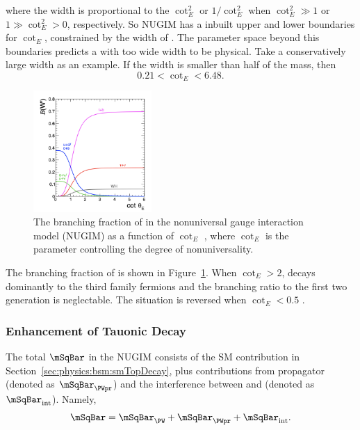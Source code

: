 \noindent where the width is proportional to the $ \cot^2_E $ or $ 1/\cot^2_E$ when $\cot^2_E \gg 1$ or $1 \gg \cot^2_E > 0$, respectively.  So NUGIM has a inbuilt upper and lower boundaries for $\cot_E$, constrained by the width of \PWpr. The parameter space beyond this boundaries predicts a \PWpr with too wide width to be physical.  Take a conservatively large width as an example. If the width is smaller than half of the \PWpr mass, then 
\begin{equation}
    0.21 < \cot_E < 6.48.
\end{equation}


\begin{figure}[ht]
    \centering
    \includegraphics[width=0.4\textwidth]{chapters/Physics/sectionBSM/figures/WPDecayBr.png}
    \caption{The branching fraction of \PWpr in the nonuniversal gauge interaction model (NUGIM) as a function of $\cot_E$ \cite{Sirunyan:2018lbg}, where $\cot_E$ is the parameter controlling the degree of nonuniversality.}
    \label{fig:physics:bsm:WPrime:braching}
\end{figure}



\noindent The branching fraction of \PWpr is shown in Figure~\ref{fig:physics:bsm:WPrime:braching}. When $\cot_E > 2$, \PWpr decays dominantly to the third family fermions and the branching ratio to the first two generation is neglectable. The situation is reversed when $\cot_E<0.5$ .


\subsubsection{Enhancement of Tauonic Decay}

The total $\mSqBar$ in the NUGIM consists of the SM contribution in Section~\ref{sec:physics:bsm:smTopDecay}, plus contributions from \PWpr propagator (denoted as $\mSqBar _{\PWpr} $) and the interference between \PW and \PWpr (denoted as $\mSqBar_{\mathrm{int}} $). Namely,
\begin{equation}
	\mSqBar  = \mSqBar _{\PW} +  \mSqBar _{\PWpr} +  \mSqBar _{\mathrm{int}} .
\end{equation}

